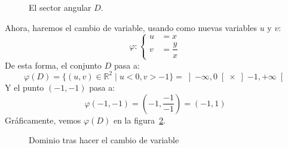\begin{ejemplo}
\begin{figure}[H]
\caption{El sector angular $D$.}
\label{graph:sector_angular_ejercicio}
\end{figure}
\noindent
    Ahora, haremos el cambio de variable, usando como nuevas variables $u$ y $v$:
    \begin{equation*}
        \varphi: \left\{\begin{array}{rl}
                u &= x \\
                v &= \dfrac{y}{x}
        \end{array}\right.
    \end{equation*}
    De esta forma, el conjunto $D$ pasa a:
    \begin{equation*}
        \varphi(D) = \{(u,v)\in \mathbb{R}^2 \mid u < 0, v > -1\} = \left]-\infty, 0\right[ \times \left]-1,+\infty\right[
    \end{equation*}
    Y el punto $(-1,-1)$ pasa a:
    \begin{equation*}
        \varphi(-1,-1) = \left(-1, \dfrac{-1}{-1}\right) = (-1, 1)
    \end{equation*}
    Gráficamente, vemos $\varphi(D)$ en la figura~\ref{graph:banda_horizontal_ejercicio}.

\begin{figure}%
\centering
{}
\caption{Dominio tras hacer el cambio de variable}
\label{graph:banda_horizontal_ejercicio}
\end{figure}


\end{ejemplo}
